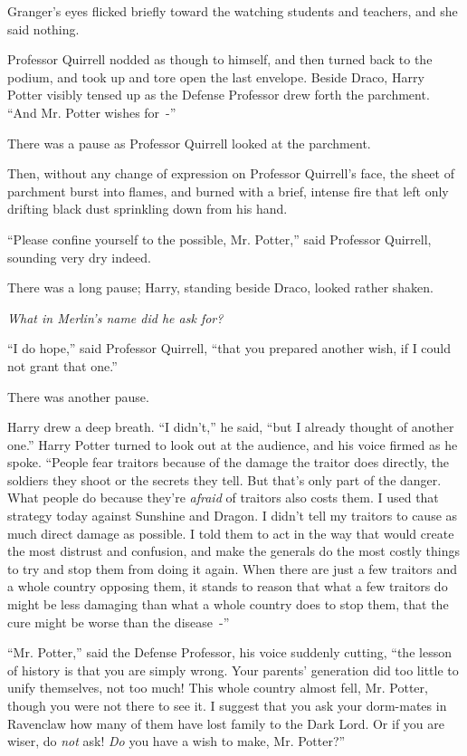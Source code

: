 Granger's eyes flicked briefly toward the watching students and teachers, and she said nothing.

Professor Quirrell nodded as though to himself, and then turned back to the podium, and took up and tore open the last envelope. Beside Draco, Harry Potter visibly tensed up as the Defense Professor drew forth the parchment. ``And Mr. Potter wishes for~-''

There was a pause as Professor Quirrell looked at the parchment.

Then, without any change of expression on Professor Quirrell's face, the sheet of parchment burst into flames, and burned with a brief, intense fire that left only drifting black dust sprinkling down from his hand.

``Please confine yourself to the possible, Mr. Potter,'' said Professor Quirrell, sounding very dry indeed.

There was a long pause; Harry, standing beside Draco, looked rather shaken.

\emph{What in Merlin's name did he ask for?}

``I do hope,'' said Professor Quirrell, ``that you prepared another wish, if I could not grant that one.''

There was another pause.

Harry drew a deep breath. ``I didn't,'' he said, ``but I already thought of another one.'' Harry Potter turned to look out at the audience, and his voice firmed as he spoke. ``People fear traitors because of the damage the traitor does directly, the soldiers they shoot or the secrets they tell. But that's only part of the danger. What people do because they're \emph{afraid} of traitors also costs them. I used that strategy today against Sunshine and Dragon. I didn't tell my traitors to cause as much direct damage as possible. I told them to act in the way that would create the most distrust and confusion, and make the generals do the most costly things to try and stop them from doing it again. When there are just a few traitors and a whole country opposing them, it stands to reason that what a few traitors do might be less damaging than what a whole country does to stop them, that the cure might be worse than the disease~-''

``Mr. Potter,'' said the Defense Professor, his voice suddenly cutting, ``the lesson of history is that you are simply wrong. Your parents' generation did too little to unify themselves, not too much! This whole country almost fell, Mr. Potter, though you were not there to see it. I suggest that you ask your dorm-mates in Ravenclaw how many of them have lost family to the Dark Lord. Or if you are wiser, do \emph{not} ask! \emph{Do} you have a wish to make, Mr. Potter?''

